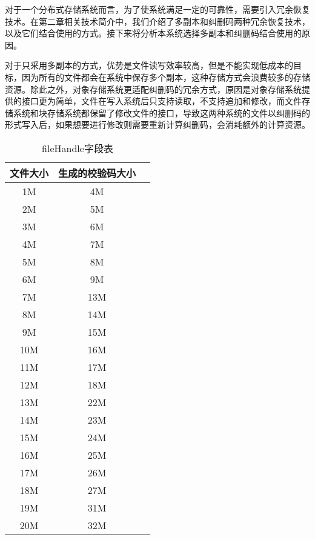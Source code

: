 对于一个分布式存储系统而言，为了使系统满足一定的可靠性，需要引入冗余恢复技术。在第二章相关技术简介中，我们介绍了多副本和纠删码两种冗余恢复技术，以及它们结合使用的方式。接下来将分析本系统选择多副本和纠删码结合使用的原因。

对于只采用多副本的方式，优势是文件读写效率较高，但是不能实现低成本的目标，因为所有的文件都会在系统中保存多个副本，这种存储方式会浪费较多的存储资源。除此之外，对象存储系统更适配纠删码的冗余方式，原因是对象存储系统提供的接口更为简单，文件在写入系统后只支持读取，不支持追加和修改，而文件存储系统和块存储系统都保留了修改文件的接口，导致这两种系统的文件以纠删码的形式写入后，如果想要进行修改则需要重新计算纠删码，会消耗额外的计算资源。

\begin{table}[h]
  \centering
  \caption{fileHandle字段表}
  \begin{tabular}{ccc}
    \toprule
    文件大小     & 生成的校验码大小 \\
    \midrule
    1M & 4M                     \\
    2M & 5M                     \\
    3M & 6M                     \\
    4M & 7M                     \\
    5M & 8M                     \\
    6M & 9M                     \\
    7M & 13M                     \\
    8M & 14M                     \\
    9M & 15M                     \\
    10M & 16M                     \\
    11M & 17M                     \\
    12M & 18M                     \\
    13M & 22M                     \\
    14M & 23M                     \\
    15M & 24M                     \\
    16M & 25M                     \\
    17M & 26M                     \\
    18M & 27M                     \\
    19M & 31M                     \\
    20M & 32M                     \\
    \bottomrule
  \end{tabular}
\end{table}


